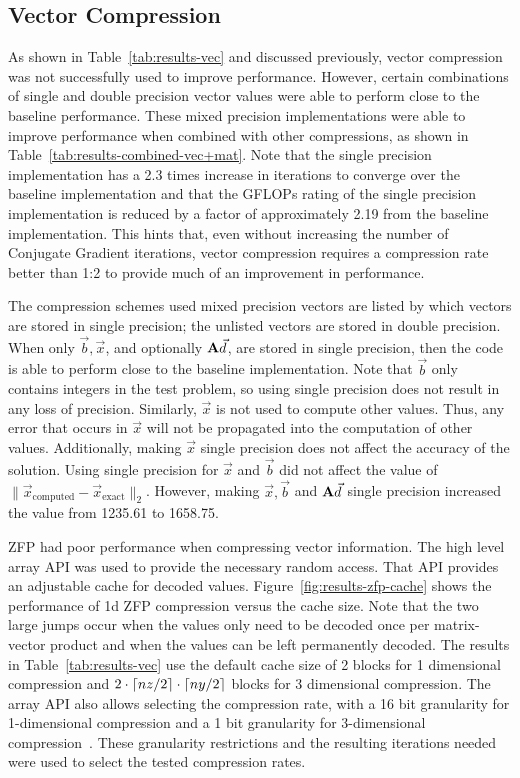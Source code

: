 

\subsection{Vector Compression}
\label{sec:results-vec}
As shown in Table~\ref{tab:results-vec} and discussed previously, vector compression was not successfully used to improve performance.
However, certain combinations of single and double precision vector values were able to perform close to the baseline performance.
These mixed precision implementations were able to improve performance when combined with other compressions, as shown in Table~\ref{tab:results-combined-vec+mat}.
Note that the single precision implementation has a 2.3 times increase in iterations to converge over the baseline implementation and that the GFLOPs rating of the single precision implementation is reduced by a factor of approximately 2.19 from the baseline implementation.
This hints that, even without increasing the number of Conjugate Gradient iterations, vector compression requires a compression rate better than 1:2 to provide much of an improvement in performance.

The compression schemes used mixed precision vectors are listed by which vectors are stored in single precision; the unlisted vectors are stored in double precision.
When only \(\vec{b}, \vec{x}\), and optionally \(\mathbf{A}\vec{d}\), are stored in single precision, then the code is able to perform close to the baseline implementation.
Note that \(\vec{b}\) only contains integers in the test problem, so using single precision does not result in any loss of precision.
Similarly, \(\vec{x}\) is not used to compute other values.
Thus, any error that occurs in \(\vec{x}\) will not be propagated into the computation of other values.
Additionally, making \(\vec{x}\) single precision does not affect the accuracy of the solution.
Using single precision for \(\vec{x}\) and \(\vec{b}\) did not affect the value of \(\|\vec{x}_\text{computed} - \vec{x}_\text{exact}\|_2\).
However, making \(\vec{x}, \vec{b}\) and \(\mathbf{A}\vec{d}\) single precision increased the value from 1235.61 to 1658.75.

ZFP had poor performance when compressing vector information.
The high level array API was used to provide the necessary random access.
That API provides an adjustable cache for decoded values.
Figure~\ref{fig:results-zfp-cache} shows the performance of 1d ZFP compression versus the cache size.
Note that the two large jumps occur when the values only need to be decoded once per matrix-vector product and when the values can be left permanently decoded.
The results in Table~\ref{tab:results-vec} use the default cache size of 2 blocks for 1 dimensional compression and \({2\cdot\lceil nz/2\rceil\cdot\lceil ny/2\rceil}\) blocks for 3 dimensional compression.
The array API also allows selecting the compression rate, with a 16 bit granularity for 1-dimensional compression and a 1 bit granularity for 3-dimensional compression~\cite{Lindstrom:2014:zfp}.
These granularity restrictions and the resulting iterations needed were used to select the tested compression rates.

